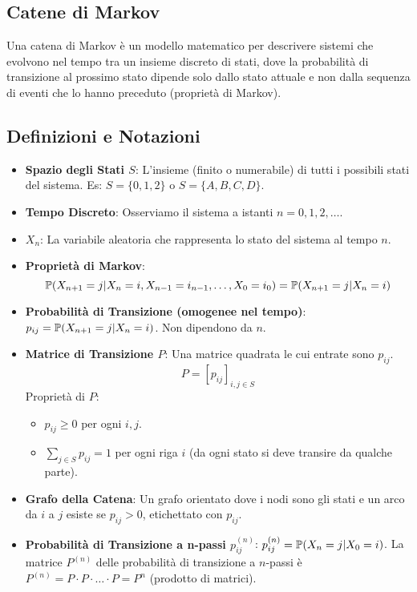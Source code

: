 \documentclass[12pt,a4paper]{article}
\begin{document}
\begin{example}
\chapter{Catene di Markov}
\label{cap:markov}
Una catena di Markov è un modello matematico per descrivere sistemi che evolvono nel tempo tra un insieme discreto di stati, dove la probabilità di transizione al prossimo stato dipende solo dallo stato attuale e non dalla sequenza di eventi che lo hanno preceduto (proprietà di Markov).

\section{Definizioni e Notazioni}
\begin{itemize}
    \item \textbf{Spazio degli Stati $S$}: L'insieme (finito o numerabile) di tutti i possibili stati del sistema. Es: $S=\{0, 1, 2\}$ o $S=\{A, B, C, D\}$.
    \item \textbf{Tempo Discreto}: Osserviamo il sistema a istanti $n=0, 1, 2, \dots$.
    \item \textbf{$X_n$}: La variabile aleatoria che rappresenta lo stato del sistema al tempo $n$.
    \item \textbf{Proprietà di Markov}:
    \[ \mathbb{P}(X_{n+1}=j | X_n=i, X_{n-1}=i_{n-1}, \dots, X_0=i_0) = \mathbb{P}(X_{n+1}=j | X_n=i) \]
    \item \textbf{Probabilità di Transizione (omogenee nel tempo)}: $p_{ij} = \mathbb{P}(X_{n+1}=j | X_n=i)$. Non dipendono da $n$.
    \item \textbf{Matrice di Transizione $P$}: Una matrice quadrata le cui entrate sono $p_{ij}$.
    \[ P = [p_{ij}]_{i,j \in S} \]
    Proprietà di $P$:
    \begin{itemize}
        \item $p_{ij} \ge 0$ per ogni $i,j$.
        \item $\sum_{j \in S} p_{ij} = 1$ per ogni riga $i$ (da ogni stato si deve transire da qualche parte).
    \end{itemize}
    \item \textbf{Grafo della Catena}: Un grafo orientato dove i nodi sono gli stati e un arco da $i$ a $j$ esiste se $p_{ij}>0$, etichettato con $p_{ij}$.
    \item \textbf{Probabilità di Transizione a n-passi $p_{ij}^{(n)}$}: $p_{ij}^{(n)} = \mathbb{P}(X_n=j | X_0=i)$.
    La matrice $P^{(n)}$ delle probabilità di transizione a $n$-passi è $P^{(n)} = P \cdot P \cdot \dots \cdot P = P^n$ (prodotto di matrici).
\end{itemize}


\end{example}
\end{document}
